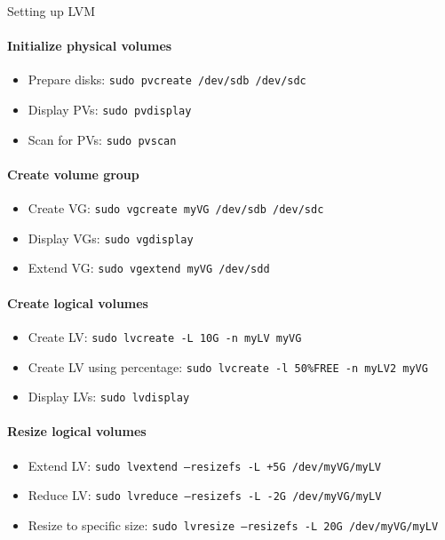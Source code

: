\begin{KR}{Setting up LVM}
    \paragraph{Initialize physical volumes}
    \begin{itemize}
        \item Prepare disks: \texttt{sudo pvcreate /dev/sdb /dev/sdc}
        \item Display PVs: \texttt{sudo pvdisplay}
        \item Scan for PVs: \texttt{sudo pvscan}
    \end{itemize}
    
    \paragraph{Create volume group}
    \begin{itemize}
        \item Create VG: \texttt{sudo vgcreate myVG /dev/sdb /dev/sdc}
        \item Display VGs: \texttt{sudo vgdisplay}
        \item Extend VG: \texttt{sudo vgextend myVG /dev/sdd}
    \end{itemize}
    
    \paragraph{Create logical volumes}
    \begin{itemize}
        \item Create LV: \texttt{sudo lvcreate -L 10G -n myLV myVG}
        \item Create LV using percentage: \texttt{sudo lvcreate -l 50\%FREE -n myLV2 myVG}
        \item Display LVs: \texttt{sudo lvdisplay}
    \end{itemize}
    
    \paragraph{Resize logical volumes}
    \begin{itemize}
        \item Extend LV: \texttt{sudo lvextend --resizefs -L +5G /dev/myVG/myLV}
        \item Reduce LV: \texttt{sudo lvreduce --resizefs -L -2G /dev/myVG/myLV}
        \item Resize to specific size: \texttt{sudo lvresize --resizefs -L 20G /dev/myVG/myLV}
    \end{itemize}
    

\end{KR}
